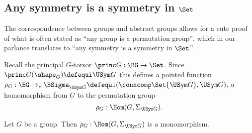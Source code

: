 \subsection{Any symmetry is a symmetry in $\Set$}
\label{sec:groupssubperm}


The correspondence between groups and abstract groups allows for a cute proof of what is often stated as ``any group is a permutation group'', which in our parlance translates to ``any symmetry is a symmetry in $\Set$''.

Recall the principal $G$-torsor $\princ G:\BG\to\Set$.
Since $\princ G(\shape_G)\defequi \USym G$ this defines a pointed function $\rho_G:\BG\to_* \BSigma_{\USym G}\defequi(\conncomp \Set {\USym G},\USym G)$,
 \ie a homomorphism from $G$ to the permutation group
$$\rho_G:\Hom(G,\Sigma_{\USym G}).$$
\begin{lemma}
  \label{lem:allgpsarepermutationgps}
  Let $G$ be a group. Then
  $\rho_G:\Hom(G,\Sigma_{\USym G})  $ is a monomorphism.
\end{lemma}
